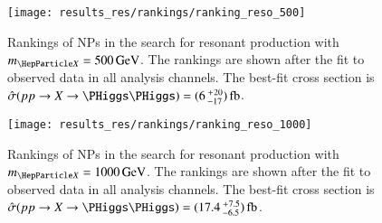 \begin{figure}[htbp]
  \centering

  \texttt{[image: results\_res/rankings/ranking\_reso\_500]}

  \caption[Rankings of NPs in the search for resonant \HH production with
  $\mX = \SI{500}{\GeV}$]{Rankings of NPs in the search for resonant \HH
    production with $\mX = \SI{500}{\GeV}$. The rankings are shown after the fit
    to observed data in all analysis channels. The best-fit cross section is
    $\hat{\sigma}(\pp \to X \to \HH) =
    (\num{6}\valuesep^{\hspace{0.25pt}+\hspace{0.25pt}20}_{-17})\valuesep\si{\femto\barn}$.}%
  \label{fig:ranking_pulls_mx500}
\end{figure}


\begin{figure}[htbp]
  \centering

  \texttt{[image: results\_res/rankings/ranking\_reso\_1000]}

  \caption[Rankings of NPs in the search for resonant \HH production with
  $\mX = \SI{1000}{\GeV}$]{Rankings of NPs in the search for resonant \HH
    production with $\mX = \SI{1000}{\GeV}$. The rankings are shown after the
    fit to observed data in all analysis channels. The best-fit cross section is
    $\hat{\sigma}(\pp \to X \to \HH) =
    (\num{17.4}\valuesep^{\hspace{0.25pt}+\hspace{0.25pt}7.5}_{-6.5})\valuesep\si{\femto\barn}$.}%
  \label{fig:ranking_pulls_mx1000}
\end{figure}


